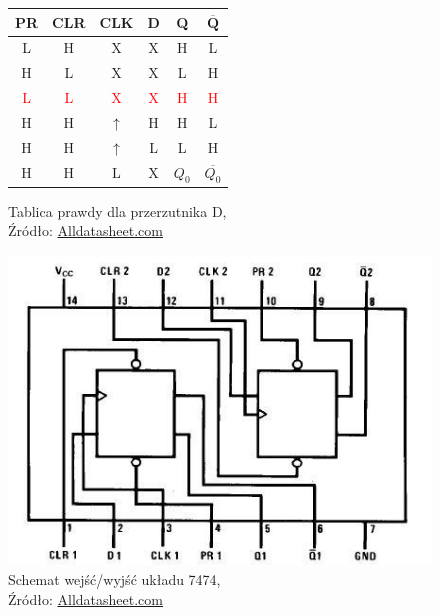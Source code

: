 \documentclass{article}
\begin{document}
      \begin{figure}[!ht]
        \begin{minipage}{.5\textwidth}
            \centering
            \begin{tabular}{|c|c|c|c|c|c|}
              \hline
              \small \textbf{PR} & \small \textbf{CLR} & \small \textbf{CLK} & \small \textbf{D} & \small \textbf{Q} & \small $\mathbf{\overline{Q}}$ \\
              \hline
              L & H & X & X & H & L \\
              H & L & X & X & L & H \\
              \textcolor{red}{L} & \textcolor{red}{L} & \textcolor{red}{X} & \textcolor{red}{X} & \textcolor{red}{H} & \textcolor{red}{H} \\
              H & H & $\uparrow$ & H & H & L \\
              H & H & $\uparrow$ & L & L & H \\
              H & H & L & X & $Q_0$ & $\overline{Q_0}$ \\
              \hline
              \end{tabular}
              
            \caption{Tablica prawdy dla przerzutnika D,
            \\Źródło: \href{https://pdf1.alldatasheet.com/datasheet-pdf/view/50913/FAIRCHILD/7474.html}{Alldatasheet.com}}
        \end{minipage}
        \begin{minipage}{.5\textwidth}
          \centering
          \includegraphics[scale=0.35]{grafiki/7474_scheme.jpg}
          \caption{Schemat wejść/wyjść układu 7474,
          \\Źródło: \href{https://pdf1.alldatasheet.com/datasheet-pdf/view/50913/FAIRCHILD/7474.html}{Alldatasheet.com}}
        \end{minipage}
      \end{figure}
\end{document}
